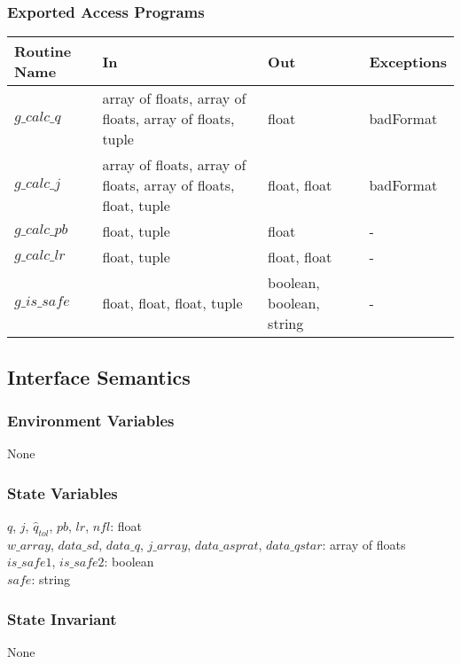 \documentclass[12pt]{article}
\begin{document}
\subsubsection{Exported Access Programs}
\begin{center}
\begin{tabular}{l p{3cm} l l} \hline 
\textbf{Routine Name} & \textbf{In} &\textbf{Out} & \textbf{Exceptions} \\ \hline 
$g\_calc\_q$ &array of floats, array of floats, array of floats, tuple& float & badFormat \\ \hline
$g\_calc\_j$ &array of floats, array of floats, array of floats, float, tuple& float, float & badFormat \\ \hline
$g\_calc\_pb$ &float, tuple& float & - \\ \hline
$g\_calc\_lr$ &float, tuple& float, float & - \\ \hline
$g\_is\_safe$ &float, float, float, tuple& boolean, boolean, string & - \\ \hline
\end{tabular}
\end{center}

\subsection{Interface Semantics}

\subsubsection{Environment Variables}

None

\subsubsection{State Variables}

$q$, $j$, $\hat{q}_{tol}$, $pb$, $lr$, $nfl$: float \\
$w\_array$, $data\_sd$, $data\_q$, $j\_array$, $data\_asprat$, $data\_qstar$: array of floats\\
$is\_safe1$, $is\_safe2$: boolean \\
$safe$: string

\subsubsection{State Invariant}

None
\end{document}
